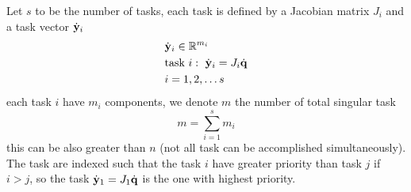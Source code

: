 \documentclass[10pt, a4paper]{report}
\begin{document}
Let $s$ to be the number of tasks, each task is defined by a Jacobian matrix $J_i$ and a task vector ${\dot{\mathbf y}}_i$\begin{align}
    &{\dot{\mathbf y}}_i\in {\mathbb R}^{m_i}\\ 
    &\text{task }i: \ {\dot{\mathbf y}}_i=J_i{\dot{\mathbf q}}\\ 
    &i=1,2,\dots s
\end{align}
each task $i$ have $m_i$ components, we denote $m$ the number of total singular task\begin{equation}
    m=\sum_{i=1}^s m_i 
\end{equation}
this can be also greater than $n$ (not all task can be accomplished simultaneously). The task are indexed such that the task $i$ have greater priority than task $j$ if $i>j$, so the task ${\dot{\mathbf y}}_1=J_1{\dot{\mathbf q}}$ is the one with highest priority.
\end{document}
